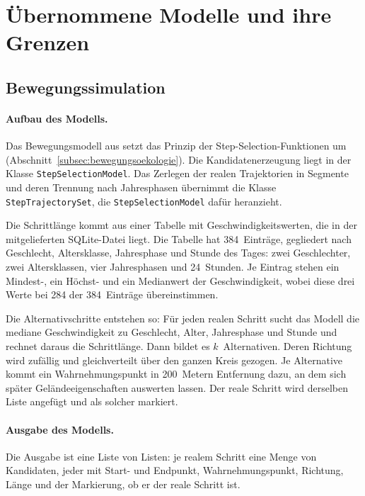 \documentclass[12pt,a4paper]{report}
\begin{document}
\section{Übernommene Modelle und ihre Grenzen}
\label{sec:uebernommene-modelle}

\subsection{Bewegungssimulation}
\label{subsec:simulationsmodell}

\paragraph{Aufbau des Modells.}

Das Bewegungsmodell aus \cite{BreuBA} setzt das Prinzip der Step-Selection-Funktionen um
(Abschnitt~\ref{subsec:bewegungsoekologie}). Die Kandidatenerzeugung liegt in der Klasse
\texttt{StepSelectionModel}. Das Zerlegen der realen Trajektorien in Segmente und deren
Trennung nach Jahresphasen übernimmt die Klasse \texttt{StepTrajectorySet}, die
\texttt{StepSelectionModel} dafür heranzieht.

Die Schrittlänge kommt aus einer Tabelle mit Geschwindigkeitswerten, die in der
mitgelieferten SQLite-Datei liegt. Die Tabelle hat 384~Einträge, gegliedert nach Geschlecht,
Altersklasse, Jahresphase und Stunde des Tages: zwei Geschlechter, zwei Altersklassen, vier
Jahresphasen und 24~Stunden. Je Eintrag stehen ein Mindest-, ein Höchst- und ein Medianwert
der Geschwindigkeit, wobei diese drei Werte bei 284 der 384~Einträge übereinstimmen.

Die Alternativschritte entstehen so: Für jeden realen Schritt sucht das Modell die mediane
Geschwindigkeit zu Geschlecht, Alter, Jahresphase und Stunde und rechnet daraus die
Schrittlänge. Dann bildet es $k$~Alternativen. Deren Richtung wird zufällig und
gleichverteilt über den ganzen Kreis gezogen. Je Alternative kommt ein Wahrnehmungspunkt in
200~Metern Entfernung dazu, an dem sich später Geländeeigenschaften auswerten lassen. Der
reale Schritt wird derselben Liste angefügt und als solcher markiert.

\paragraph{Ausgabe des Modells.}

Die Ausgabe ist eine Liste von Listen: je realem Schritt eine Menge von Kandidaten, jeder
mit Start- und Endpunkt, Wahrnehmungspunkt, Richtung, Länge und der Markierung, ob er der
reale Schritt ist.
\end{document}
